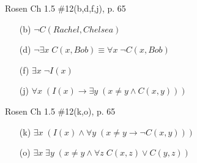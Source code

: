 \documentclass[12pt,addpoints]{exam}
\newcommand{\ra}{\rightarrow}
\newcommand{\lra}{\leftrightarrow}
\begin{document}
\begin{questions}
\question[8] Rosen Ch 1.5 \#12(b,d,f,j), p. 65
    \ifprintanswers
        \vspace{-10pt}
    \fi
\begin{solution}
    \begin{itemize}[itemsep=0pt,parsep=0pt,topsep=0pt,partopsep=0pt]
        \item[(b)] $\neg C(Rachel, Chelsea)$
        \item[(d)] $\neg \exists x\; C(x,Bob) \equiv \forall x\; \neg C(x,Bob)$
        \item[(f)] $\exists x\; \neg I(x)$
        \item[(j)] $\forall x\; (I(x) \ra \exists y\; (x \neq y \wedge C(x,y)))$
    \end{itemize}
\end{solution}


\bonusquestion[2] Rosen Ch 1.5 \#12(k,o), p. 65
    \ifprintanswers
        \vspace{-10pt}
    \fi
\begin{solution}
    \begin{itemize}[itemsep=0pt,parsep=0pt,topsep=0pt,partopsep=0pt]
        \item[(k)] $\exists x\; (I(x) \wedge \forall y\; (x \neq y \ra \neg C(x,y)))$
        \item[(o)] $\exists x\; \exists y\; (x \neq y \wedge \forall z\; C(x,z) \vee C(y,z))$
    \end{itemize}
\end{solution}



\end{questions}
\end{document}
